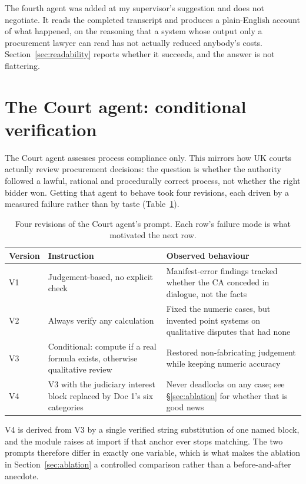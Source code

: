 The fourth agent was added at my supervisor's suggestion and does not negotiate.
It reads the completed transcript and produces a plain-English account of what
happened, on the reasoning that a system whose output only a procurement lawyer
can read has not actually reduced anybody's costs. Section~\ref{sec:readability}
reports whether it succeeds, and the answer is not flattering.

\section{The Court agent: conditional verification}
\label{sec:court-design}

The Court agent assesses process compliance only. This mirrors how UK courts
actually review procurement decisions: the question is whether the authority
followed a lawful, rational and procedurally correct process, not whether the
right bidder won. Getting that agent to behave took four revisions, each driven by
a measured failure rather than by taste (Table~\ref{tab:court-versions}).

\begin{table}[htbp]
\centering
\footnotesize
\caption[Court prompt revisions]{Four revisions of the Court agent's prompt. Each
row's failure mode is what motivated the next row.}
\label{tab:court-versions}
\begin{tabular}{@{}llp{7.0cm}@{}}
\toprule
\textbf{Version} & \textbf{Instruction} & \textbf{Observed behaviour} \\
\midrule
V1 & Judgement-based, no explicit check &
  Manifest-error findings tracked whether the CA conceded in dialogue, not the facts \\
V2 & Always verify any calculation &
  Fixed the numeric cases, but invented point systems on qualitative disputes that had none \\
V3 & Conditional: compute if a real formula exists, otherwise qualitative review &
  Restored non-fabricating judgement while keeping numeric accuracy \\
V4 & V3 with the judiciary interest block replaced by Doc 1's six categories &
  Never deadlocks on any case; see \S\ref{sec:ablation} for whether that is good news \\
\bottomrule
\end{tabular}
\end{table}

V4 is derived from V3 by a single verified string substitution of one named block,
and the module raises at import if that anchor ever stops matching. The two
prompts therefore differ in exactly one variable, which is what makes the ablation
in Section~\ref{sec:ablation} a controlled comparison rather than a
before-and-after anecdote.

